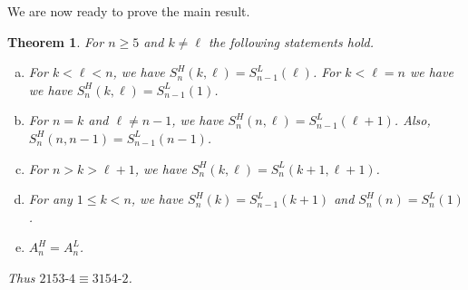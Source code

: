 \documentclass[11pt]{amsart}
\newtheorem{theorem}{Theorem}[section]
\theoremstyle{definition}
\begin{document}
We are now ready to prove the main result.
\begin{theorem}
	\label{thm:H}
	For $n \ge 5$ and $k \neq \ell$ the following statements hold.
	\begin{enumerate}[(a)]
		\item For $k < \ell < n$,
			we have $S_n^H(k, \ell) = S_{n-1}^L(\ell)$.
			For $k < \ell = n$ we have
			we have $S_n^H(k, \ell) = S_{n-1}^L(1)$.
		\item For $n = k$ and $\ell \neq n-1$,
			we have $S_n^H(n, \ell) = S_{n-1}^L(\ell+1)$.
			Also, $S_n^H(n, n-1) = S_{n-1}^L(n-1)$.
		\item For $n > k > \ell+1$,
			we have $S_n^H(k, \ell) = S_n^L(k+1, \ell+1)$.
		\item For any $1 \le k < n$,
			we have $S_n^H(k) = S_{n-1}^L(k+1)$ and
			$S_n^H(n) = S_n^L(1)$.
		\item $A_n^H = A_n^L$.
	\end{enumerate}
	Thus $2153{\text{-}}4 \equiv 3154{\text{-}}2$.
\end{theorem}
\end{document}
